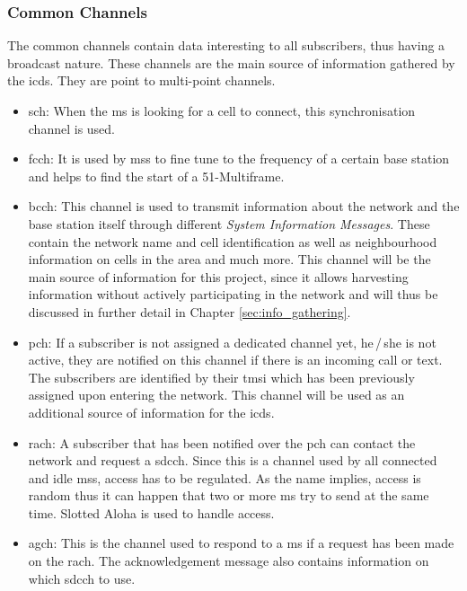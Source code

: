 \subsubsection{Common Channels}
\label{sec:common_channels}
The common channels contain data interesting to all subscribers, thus having a broadcast nature.
These channels are the main source of information gathered by the \gls{icds}.
They are point to multi-point channels.
\begin{itemize}
	\item \gls{sch}: When the \gls{ms} is looking for a cell to connect, this synchronisation channel is used.
	\item \gls{fcch}: It is used by \glspl{ms} to fine tune to the frequency of a certain base station and helps to find the start of a 51-Multiframe.
	\item \gls{bcch}: This channel is used to transmit information about the network and the base station itself through different \emph{System Information Messages}.
	These contain the network name and cell identification as well as neighbourhood information on cells in the area and much more.
	This channel will be the main source of information for this project, since it allows harvesting information without actively participating in the network and will thus be discussed in further detail in Chapter \ref{sec:info_gathering}.
	\item \gls{pch}: If a subscriber is not assigned a dedicated channel yet, \ie he\,/\,she is not active, they are notified on this channel if there is an incoming call or text.
	The subscribers are identified by their \gls{tmsi} which has been previously assigned upon entering the network.
	This channel will be used as an additional source of information for the \gls{icds}.
	\item \gls{rach}: A subscriber that has been notified over the \gls{pch} can contact the network and request a \gls{sdcch}.
	Since this is a channel used by all connected and idle \glspl{ms}, access has to be regulated.
	As the name implies, access is random thus it can happen that two or more \gls{ms} try to send at the same time.
	Slotted Aloha is used to handle access.
	\item \gls{agch}: This is the channel used to respond to a \gls{ms} if a request has been made on the \gls{rach}.
	The acknowledgement message also contains information on which \gls{sdcch} to use.
\end{itemize}

